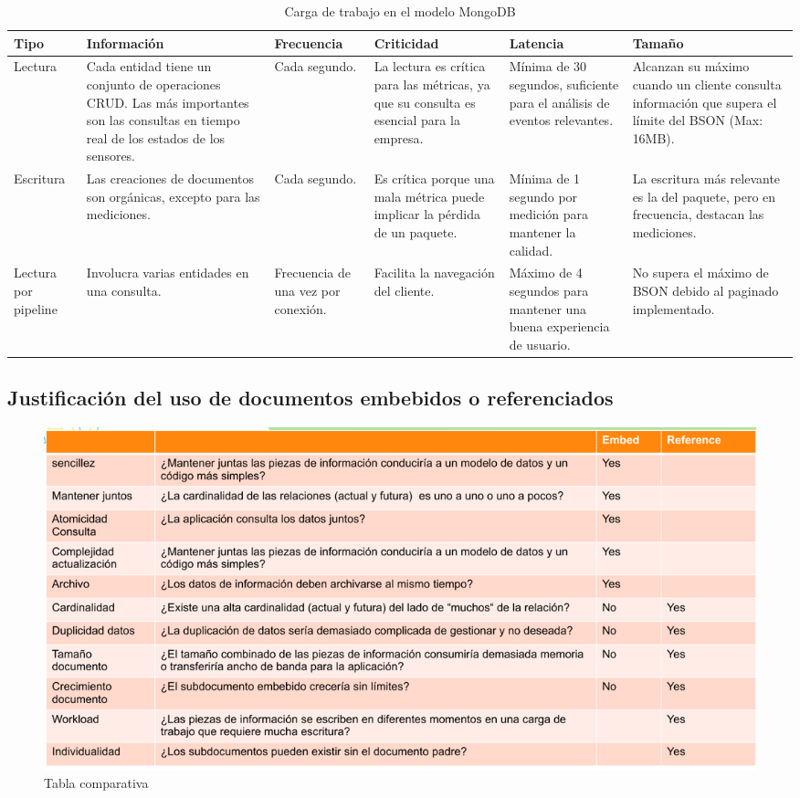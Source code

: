 \begin{table}[h!]
  \centering
  \renewcommand{\arraystretch}{2.5} %
  \begin{adjustbox}{width=\textwidth}
  \begin{tabular}{|p{2cm}|p{5cm}|p{3cm}|p{3cm}|p{3cm}|p{4cm}|}
  \hline
  \textbf{Tipo} & \textbf{Información} & \textbf{Frecuencia} & \textbf{Criticidad} & \textbf{Latencia} & \textbf{Tamaño} \\
  \hline
  Lectura & Cada entidad tiene un conjunto de operaciones CRUD. Las más importantes son las consultas en tiempo real de los estados de los sensores. & Cada segundo. & La lectura es crítica para las métricas, ya que su consulta es esencial para la empresa. & Mínima de 30 segundos, suficiente para el análisis de eventos relevantes. & Alcanzan su máximo cuando un cliente consulta información que supera el límite del BSON (Max: 16MB). \\
  \hline
  Escritura & Las creaciones de documentos son orgánicas, excepto para las mediciones. & Cada segundo. & Es crítica porque una mala métrica puede implicar la pérdida de un paquete. & Mínima de 1 segundo por medición para mantener la calidad. & La escritura más relevante es la del paquete, pero en frecuencia, destacan las mediciones. \\
  \hline
  Lectura por pipeline & Involucra varias entidades en una consulta. & Frecuencia de una vez por conexión. & Facilita la navegación del cliente. & Máximo de 4 segundos para mantener una buena experiencia de usuario. & No supera el máximo de BSON debido al paginado implementado. \\
  \hline
  \end{tabular}
  \end{adjustbox}
  \caption{Carga de trabajo en el modelo MongoDB}
\end{table}

\subsection{Justificación del uso de documentos embebidos o referenciados}

\begin{figure}[H]
  \centering
  \includegraphics[width=\textwidth]{Figures/1. Content/Referenciado.png}
  \caption{Tabla comparativa}
  \label{fig:tabla_comparativa}
\end{figure}

